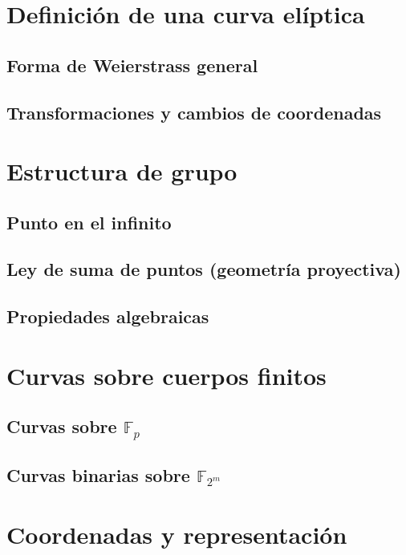 \section{Definición de una curva elíptica}\label{sec:definicion_curvas_elipticas}
\subsection{Forma de Weierstrass general}\label{sec:weierstrass_curvas_elipticas}
\subsection{Transformaciones y cambios de coordenadas}

\section{Estructura de grupo}
\subsection{Punto en el infinito}
\subsection{Ley de suma de puntos (geometría proyectiva)}
\subsection{Propiedades algebraicas}

\section{Curvas sobre cuerpos finitos}\label{sec:curvas_sobre_cuerpos_finitos}
\subsection{Curvas sobre \texorpdfstring{$\mathbb{F}_p$}{Fp}}\label{sec:curvas_sobre_cuerpos_finitos_primos}
\subsection{Curvas binarias sobre \texorpdfstring{$\mathbb{F}_{2^m}$}{F2m}}\label{sec:curvas_sobre_cuerpos_finitos_binarios}

\section{Coordenadas y representación}\label{sec:coordenadas_curvas_elipticas}
